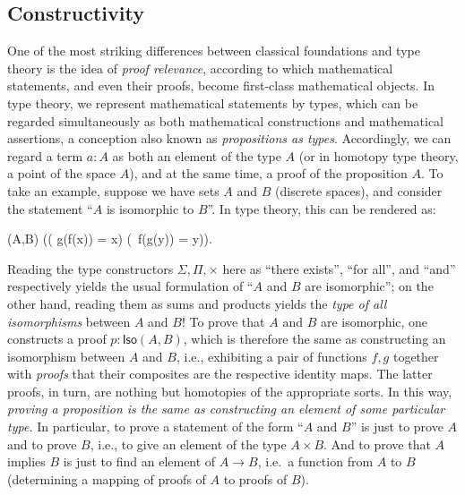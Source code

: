 \subsection*{Constructivity} 

%

One of the most striking differences between classical foundations and type theory is the idea of \emph{proof relevance}, according to which mathematical statements, and even their proofs, become first-class mathematical objects.
In type theory, we represent mathematical statements by types, which can be regarded simultaneously as both mathematical constructions and mathematical assertions, a conception also known as \emph{propositions as types}.
%
Accordingly, we can regard a term $a : A$ as both an element of the type $A$ (or in homotopy type theory, a point of the space $A$), and at the same time, a proof of the proposition $A$.
To take an example, suppose we have sets $A$ and $B$ (discrete spaces),
%
and consider the statement ``$A$ is isomorphic to $B$''.
In type theory, this can be rendered as:
\begin{narrowmultline*}
  (A,B)  \narrowbreak
  \Big(\big( g(f(x)) = x\big) \times \big(\, f(g(y)) = y\big)\Big).
\end{narrowmultline*}
%
Reading the type constructors $\Sigma, \Pi, \times$  here  as ``there exists'', ``for all'', and ``and'' respectively yields the usual formulation of ``$A$ and $B$ are isomorphic''; on the other hand, reading them as sums and products yields the \emph{type of all isomorphisms} between $A$ and $B$!  To prove that $A$ and $B$ are isomorphic, one  constructs a proof $p : \mathsf{Iso}(A,B)$, which is therefore the same  as constructing an isomorphism between $A$ and $B$, i.e., exhibiting a pair of functions $f, g$ together with \emph{proofs} that their composites are the respective identity maps.  The latter proofs, in turn, are nothing but homotopies of the appropriate sorts.  In this way, \emph{proving a proposition is the same as constructing an element of some particular type.}
In particular, to prove a statement of the form ``$A$ and $B$'' is just to prove $A$ and to prove $B$, i.e., to give an element of the type $A\times B$.
And to prove that $A$ implies $B$ is just to find an element of $A\to B$, i.e.\ a function from $A$ to $B$ (determining a mapping of proofs of $A$ to proofs of $B$).

